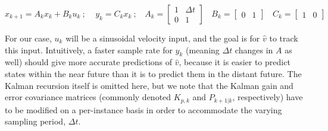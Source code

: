 $$x_{k+1} = A_kx_k + B_ku_k~; ~~~~~ y_k = C_kx_k~;~~~~A_k= \begin{bmatrix}1 & \Delta t \\ 0 & 1\end{bmatrix}~~~~B_k = \begin{bmatrix} 0 & 1 \end{bmatrix}~~~~C_k = \begin{bmatrix} 1 & 0 \end{bmatrix}$$

For our case, $u_k$ will be a sinusoidal velocity input, and the goal is for $\hat{v}$ to track this input.  Intuitively, a faster sample rate for $y_k$ (meaning $\Delta t$ changes in $A$ as well) should give more accurate predictions of $\hat{v}$, because it is easier to predict states within the near future than it is to predict them in the distant future.  The Kalman recursion itself is omitted here, but we note that the Kalman gain and error covariance matrices (commonly denoted $K_{p,k}$ and $P_{k+1|k}$, respectively)  have to be modified on a per-instance basis in order to accommodate the varying sampling period, $\Delta t$. 


